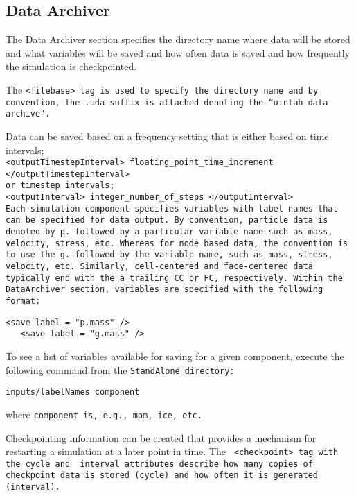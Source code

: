 \subsection{Data Archiver} \label{Sec:DataArchiver}

The Data Archiver section specifies the directory name where data will
be stored and what variables will be saved and how often data is saved
and how frequently the simulation is checkpointed.

The \tt <filebase> \normalfont tag is used to specify the directory
name and by convention, the \tt .uda \normalfont suffix is attached denoting the
``uintah data archive".

Data can be saved based on a frequency setting that is either based on time
intervals;\\
\tt <outputTimestepInterval> floating\_point\_time\_increment </outputTimestepInterval> \normalfont\\
or timestep intervals; \\
\tt <outputInterval> integer\_number\_of\_steps </outputInterval> \normalfont\\

Each simulation component specifies variables with label names that
can be specified for data output.  By convention, particle data is
denoted by \tt p. \normalfont followed by a particular variable name
such as mass, velocity, stress, etc.  Whereas for node based data, the
convention is to use the \tt g. \normalfont followed by the variable
name, such as mass, stress, velocity, etc.  Similarly, cell-centered
and face-centered data typically end with the a trailing \tt CC \normalfont
or \tt FC, \normalfont  respectively.  Within the DataArchiver
section, variables are specified with the following format:

\begin{Verbatim}[fontsize=\footnotesize]
   <save label = "p.mass" />
   <save label = "g.mass" />
\end{Verbatim}

To see a list of
variables available for saving for a given component, execute the following
command from the \tt StandAlone \normalfont directory:

\begin{Verbatim}[fontsize=\footnotesize]
inputs/labelNames component
\end{Verbatim}
where \tt component \normalfont is, e.g., \tt mpm, \normalfont \tt ice, \normalfont etc.

Checkpointing information can be created that provides a mechanism for
restarting a simulation at a later point in time.  The \tt
<checkpoint> \normalfont tag with the \tt cycle \normalfont and \tt
interval \normalfont attributes describe how many copies of checkpoint
data is stored (cycle)  and how often it is generated (interval).

